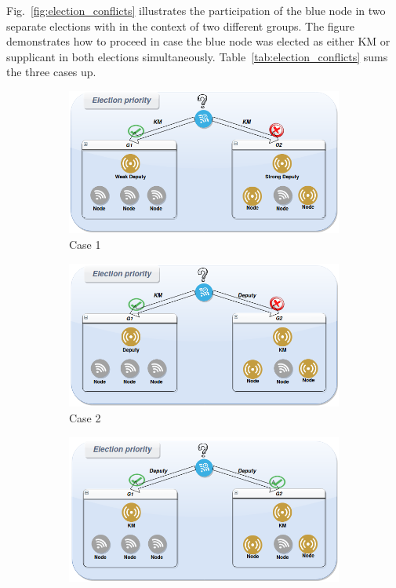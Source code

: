 Fig.~\ref{fig:election_conflicts} illustrates the participation of the blue node in two separate elections with in the context of two different groups. The figure demonstrates how to proceed in case the blue node was elected as either KM or supplicant in both elections simultaneously. Table~\ref{tab:election_conflicts} sums the three cases up.

\begin{figure}
	\centering
	\begin{subfigure}[htbp]{0.3\textwidth}
		\centering
		\includegraphics[scale=0.20]{figures/election2.png}
		\caption{Case 1}
		\label{fig:case1}
	\end{subfigure}
	\vfill
	\begin{subfigure}[htbp]{0.3\textwidth}
		\centering
		\includegraphics[scale=0.20]{figures/election3.png}
		\caption{Case 2}
		\label{fig:case2}
	\end{subfigure}
	\vfill
	\begin{subfigure}[htbp]{0.3\textwidth}
		\centering
		\includegraphics[scale=0.20]{figures/election4.png}

\end{subfigure}
\end{figure}
